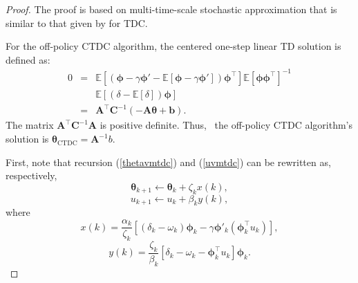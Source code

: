 \begin{proof}
    The proof is  based on multi-time-scale stochastic approximation that is    
    similar to that given by \cite{sutton2009fast} for TDC. 
    
    For the off-policy CTDC algorithm, the centered  one-step linear TD solution is defined as:
    \begin{equation*}
        \begin{array}{ccl}
            0 &=& \mathbb{E}[({\bm{\phi}} - \gamma {\bm{\phi}}' - \mathbb{E}[{\bm{\phi}} - \gamma {\bm{\phi}}']){\bm{\phi}}^\top]\mathbb{E}[{\bm{\phi}} {\bm{\phi}}^{\top}]^{-1}\\
            &&\mathbb{E}[(\delta -\mathbb{E}[\delta]){\bm{\phi}}]\\
          &=&\textbf{A}^{\top}\textbf{C}^{-1}(-\textbf{A}{\bm{\theta}}+{\bm{b}}).
         \end{array}
    \end{equation*}
    The matrix $\textbf{A}^{\top}\textbf{C}^{-1}\textbf{A}$ is positive definite. Thus,   the off-policy CTDC  algorithm's solution is
    ${\bm{\theta}}_{\text{CTDC}}=\textbf{A}^{-1}{b}$.
    
    First, note that recursion (\ref{thetavmtdc}) and (\ref{uvmtdc}) can be rewritten as, respectively, 
    \begin{equation*}
     {\bm{\theta}}_{k+1}\leftarrow {\bm{\theta}}_k+\zeta_k {x}(k),
    \end{equation*}
    \begin{equation*}
     {u}_{k+1}\leftarrow {u}_k+\beta_k {y}(k),
    \end{equation*}
    where 
    \begin{equation*}
     {x}(k)=\frac{\alpha_k}{\zeta_k}[(\delta_{k}- \omega_k) {\bm{\phi}}_k - \gamma{\bm{\phi}}'_{k}({\bm{\phi}}^{\top}_k {u}_k)],
    \end{equation*}
    \begin{equation*}
     {y}(k)=\frac{\zeta_k}{\beta_k}[\delta_{k}-\omega_k - {\bm{\phi}}^{\top}_k {u}_k]{\bm{\phi}}_k.
    \end{equation*}
    

\end{proof}
